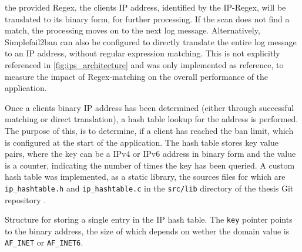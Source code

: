 the provided \ac{Regex}, the clients \ac{IP} address, identified by the \ac{IP}-\ac{Regex}, will be translated to its binary form, for further processing. If the scan does not find a match, 
the processing moves on to the next log message. Alternatively, Simplefail2ban can also be configured to directly translate the entire log message to an \ac{IP} address, without regular expression matching.
This is not explicitly referenced in \ref{fig:ips_architecture} and was only implemented as reference, to measure the impact of \ac{Regex}-matching on the overall performance of the application.
\par
Once a clients binary \ac{IP} address has been determined (either through successful matching or direct translation), a hash table lookup for the address is performed.
The purpose of this, is to determine, if a client has reached the ban limit, which is configured at the start of the application. 
The hash table stores key value pairs, where the key can be a \ac{IPv4} or \ac{IPv6} address in binary form and the value is a counter,
indicating the number of times the key has been queried. A custom hash table was implemented, as a static library, the sources files for which are \texttt{ip\_hashtable.h}
and \texttt{ip\_hashtable.c} in the \texttt{src/lib} directory of the thesis Git repository \cite{gitlab}. 

\begin{algorithm}[h!]
    
    \caption[IP Hash Table]{Structure for storing a single entry in the IP hash table. The \texttt{key} pointer 
    points to the binary address, the size of which depends on wether the domain value is \texttt{AF\_INET} or \texttt{AF\_INET6}.}
    \label{alg:ip_hashtable}
\end{algorithm}

